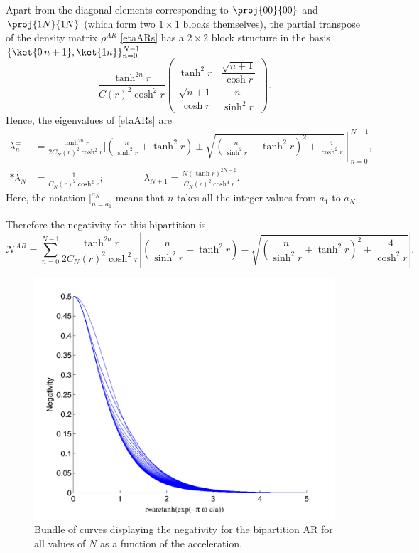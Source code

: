 Apart from the diagonal elements corresponding to $\proj{00}{00}$ and $\proj{1N}{1N}$ (which form two $1\times1$ blocks themselves), the partial transpose of the density matrix $\rho^{A R} $ \eqref{etaARs} has a $2\times2$ block structure in the basis $\{ \ket{0\, n+1},\ket{1 n}\}_{n=0}^{N-1}$
\begin{equation}\label{blocks}
\frac{\tanh^{2n}r}{C(r)^2\cosh^2 r}
\left(\!\begin{array}{cc}
\tanh^2 r & \dfrac{\sqrt{n+1}}{\cosh r}\\
\dfrac{\sqrt{n+1}}{\cosh r} & \dfrac{n}{\sinh^2r}
\end{array}\!\right).
\end{equation}
Hence, the eigenvalues of \eqref{etaARs} are
\begin{align}
\nonumber\lambda^\pm_n&\!=\!\frac{\tanh^{2n} r}{2C_N(r)^2\cosh^2 r}\Bigg[\!\left(\frac{n}{\sinh^2r}+\tanh^2 r\right)\left.\!\pm\sqrt{\left(\frac{n}{\sinh^2r}+\tanh^2 r\right)^2\!+\frac{4}{\cosh^2 r}}\right]_{n=0}^{N-1}\!\!\!\!,\\*
\lambda_N&=\frac{1}{C_N(r)^2\cosh^2r};\qquad\qquad \lambda_{N+1}=\frac{N(\tanh r)^{2N-2}}{C_N(r)^2\cosh^4 r}.
\end{align}
Here, the notation $\displaystyle{|_{n=a_1}^{a_N}}$ means that $n$ takes all the integer values from $a_1$ to $a_N$.

Therefore the negativity for this bipartition is
\begin{equation}
\mathcal{N}^{AR}\!\!=\!\!\sum_{n=0}^{N-1}\frac{\tanh^{2n} r}{2C_N(r)^2\cosh^2 r}\left|\!\left(\frac{n}{\sinh^2r}+\tanh^2 r\right)\!-\sqrt{\left(\frac{n}{\sinh^2r}+\tanh^2 r\right)^2\!\!\!\!+\!\frac{4}{\cosh^2 r}}\right|\!.
\end{equation}

\begin{figure}[h]
\begin{center}
\includegraphics[width=.85\textwidth]{bundle}
\end{center}
\caption{Bundle of curves displaying the negativity for the bipartition AR for all values of $N$ as a function of the acceleration.}
\label{bundle}
\end{figure}

